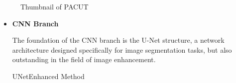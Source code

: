 \documentclass[CJK,aspectratio=169]{beamer}  %
\begin{document}
\begin{frame}
\begin{figure}
\begin{minipage}{.28\textwidth}
				\captionsetup{font=scriptsize}
				\label{fig: The proposed initial architecture(Abstract Picture)}	
				\caption*{\tiny Thumbnail of PACUT}
			\end{minipage}
			\captionsetup{font=scriptsize}
			\caption{
				\label{fig: Parallel architecture combining u-net and transformer}
			}
		\end{figure}
		
	\end{frame}
	
	\begin{frame}
		
		\begin{itemize} 
			\item \textbf{CNN Branch}
			
			\small The foundation of the CNN branch is the U-Net structure, a network architecture designed specifically for image segmentation tasks, but also outstanding in the field of image enhancement.
			
			\checkmark \small UNetEnhanced Method
		\end{itemize}
		
		
		

\end{frame}
\end{document}
